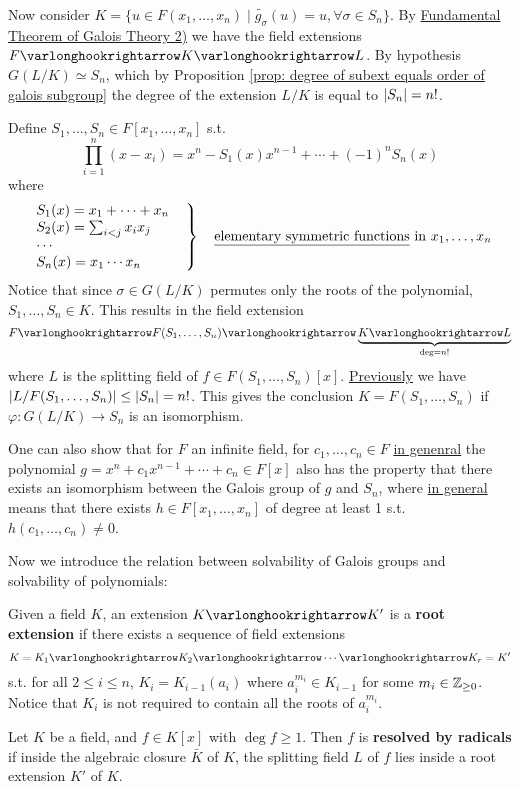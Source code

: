 \documentclass{article}
\begin{document}
Now consider $K = \{u \in F(x_1, \dots, x_n) \mid \widetilde{g_{\sigma}}(u) = u, \forall \sigma \in S_n\}$. By \hyperref[thm: fundamental theorem of galois theory]{Fundamental Theorem of Galois Theory 2)} we have the field extensions $F \ext K \ext L$. By hypothesis $G(L/K) \simeq S_n$, which by Proposition \ref{prop: degree of subext equals order of galois subgroup} the degree of the extension $L/K$ is equal to $\left|S_n\right| = n!$.

Define $S_1, \dots, S_n \in F[x_1, \dots, x_n]$ s.t. 
\[
    \prod_{i = 1}^n (x - x_i) = x^n - S_1(x) x^{n-1} + \cdots + (-1)^n S_n(x)
\]
where
\[
    \left.
    \begin{array}{l}
        S_1(x) = x_1 + \cdots + x_n \\
        S_2(x) = \sum_{i < j} x_i x_j\\
        \cdots \\
        S_n(x) = x_1 \cdots x_n
    \end{array}
    \ \ 
    \right\}
    \quad
    \text{\underline{elementary symmetric functions} in } x_1, \dots, x_n
\]
Notice that since $\sigma \in G(L/K)$ permutes only the roots of the polynomial, $S_1, \dots, S_n \in K$. This results in the field extension
\[
    F \ext F(S_1, \dots, S_n) \ext \underbrace{K \ext L}_{\deg = n!}
\]
where $L$ is the splitting field of $f \in F(S_1, \dots, S_n)[x]$. \hyperref[goto: order of galois group bounded by order of Sn]{Previously} we have $\left|L/F(S_1, \dots, S_n)\right| \leq \left|S_n\right| = n!$. This gives the conclusion $K = F(S_1, \dots, S_n)$ if $\varphi: G(L/K) \to S_n$ is an isomorphism.

\begin{remark}
    One can also show that for $F$ an infinite field, for $c_1, \dots, c_n \in F$ \underline{in genenral} the polynomial $g = x^n + c_1 x^{n-1} + \cdots + c_n \in F[x]$ also has the property that there exists an isomorphism between the Galois group of $g$ and $S_n$, where \underline{in general} means that there exists $h \in F[x_1, \dots, x_n]$ of degree at least 1 s.t. $h(c_1, \dots, c_n) \neq 0$.
\end{remark}

\textstart
Now we introduce the relation between solvability of Galois groups and solvability of polynomials:

\begin{definition}
    Given a field $K$, an extension $K \ext K'$ is a \textbf{root extension} if there exists a sequence of field extensions
    \[
        K = K_1 \ext K_2 \ext \cdots \ext K_r = K'
    \]
    s.t. for all $2 \leq i \leq n$, $K_i = K_{i-1}(a_i)$ where $a_i^{m_i} \in K_{i-1}$ for some $m_i \in \mathbb{Z}_{\geq 0}$. Notice that $K_i$ is not required to contain all the roots of $a_i^{m_i}$.
\end{definition}
\nogap
\begin{definition}
    Let $K$ be a field, and $f \in K[x]$ with $\deg f \geq 1$. Then $f$ is \textbf{resolved by radicals} if inside the algebraic closure $\bar{K}$ of $K$, the splitting field $L$ of $f$ lies inside a root extension $K'$ of $K$.
\end{definition}
\end{document}
